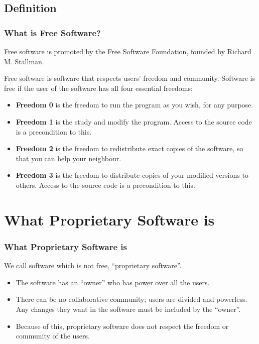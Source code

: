 \documentclass{beamer}
\begin{document}

\subsection{Definition}

\begin{frame}
\frametitle{What is Free Software?}

Free software is promoted by the Free Software Foundation, founded by 
Richard M. Stallman.

Free software is software that respects users' freedom and community.
Software is free if the user of the software has all four essential freedoms:

\begin{itemize}
\item<+-> {\bf Freedom 0} is the freedom to run the program as you wish, 
  for any purpose.
\item<+-> {\bf Freedom 1} is the study and modify the program. 
  Access to the source code is a precondition to this.
\item<+-> {\bf Freedom 2} is the freedom to redistribute exact copies of the 
  software, so that you can help your neighbour.
\item<+-> {\bf Freedom 3} is the freedom to distribute copies of your 
  modified versions to others. Access to the source code is a precondition 
  to this.
\end{itemize}
\end{frame}


\section{What Proprietary Software is}

\begin{frame}
\frametitle{What Proprietary Software is}

We call software which is not free, ``proprietary software''.

\begin{itemize}
\item<+-> The software has an ``owner'' who has power over all the users.
\item<+-> There can be no collaborative community; users are divided and 
powerless. Any changes they want in the software must be included by
the ``owner''.
\item<+-> Because of this, proprietary software does not respect the freedom 
or community of the users.
\end{itemize}

\end{frame}
\end{document}
